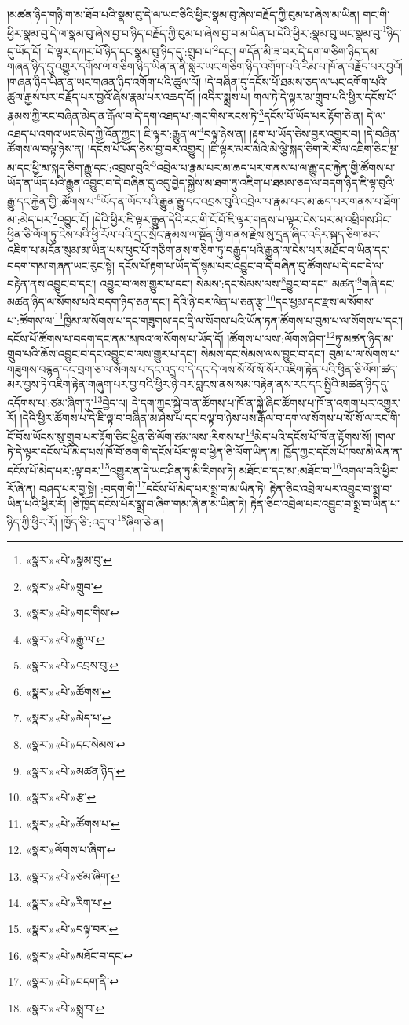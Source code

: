 །མཚན་ཉིད་གཉི་ག་མ་ཐོབ་པའི་སྣམ་བུ་དེ་ལ་ཡང་ཅིའི་ཕྱིར་སྣམ་བུ་ཞེས་བརྗོད་ཀྱི་བུམ་པ་ཞེས་མ་ཡིན། གང་གི་ཕྱིར་སྣམ་བུ་དེ་ལ་སྣམ་བུ་ཞེས་བྱ་བ་ཉིད་བརྗོད་ཀྱི་བུམ་པ་ཞེས་བྱ་བ་མ་ཡིན་པ་དེའི་ཕྱིར་:སྣམ་བུ་ཡང་སྣམ་བུ་\footnote{«སྣར་»«པེ་»སྣམ་བུ་}ཉིད་དུ་ཡོད་དོ། །དེ་ལྟར་དཀར་པོ་ཉིད་དང་སྣམ་བུ་ཉིད་དུ་:གྲུབ་པ་\footnote{«སྣར་»«པེ་»གྲུབ་}དང་། གདོན་མི་ཟ་བར་དེ་དག་གཅིག་ཉིད་དམ་གཞན་ཉིད་དུ་འགྱུར་དགོས་ལ་གཅིག་ཉིད་ཡིན་ན་ནི་སླར་ཡང་གཅིག་ཉིད་འགོག་པའི་རིམ་པ་ཁོ་ན་བརྗོད་པར་བྱའོ། །གཞན་ཉིད་ཡིན་ན་ཡང་གཞན་ཉིད་འགོག་པའི་ཚུལ་ལོ། །དེ་བཞིན་དུ་དངོས་པོ་ཐམས་ཅད་ལ་ཡང་འགོག་པའི་ཚུལ་རྒྱས་པར་བརྗོད་པར་བྱའོ་ཞེས་རྣམ་པར་འཆད་དོ། །འདིར་སྨྲས་པ། གལ་ཏེ་དེ་ལྟར་མ་གྲུབ་པའི་ཕྱིར་དངོས་པོ་རྣམས་ཀྱི་རང་བཞིན་མེད་ན་རྒོལ་བ་དེ་དག་འཐད་པ་:གང་གིས་རངས་ཏེ་\footnote{«སྣར་»«པེ་»གང་གིས་}དངོས་པོ་ཡོད་པར་རྟོག་ཅེ་ན། དེ་ལ་འཐད་པ་འགའ་ཡང་མེད་ཀྱི་འོན་ཀྱང་། ཇི་ལྟར་:རྒྱུན་ལ་\footnote{«སྣར་»«པེ་»རྒྱུ་ལ་}བལྟ་ཉེས་ན། །རྟག་པ་ཡོད་ཅེས་བྱར་འགྱུར་བ། །དེ་བཞིན་ཚོགས་ལ་བལྟ་ཉེས་ན། །དངོས་པོ་ཡོད་ཅེས་བྱ་བར་འགྱུར། །ཇི་ལྟར་མར་མེའི་མེ་ལྕེ་སྐད་ཅིག་རེ་རེ་ལ་འཇིག་ཅིང་སྔ་མ་དང་ཕྱི་མ་སྐད་ཅིག་རྒྱུ་དང་:འབྲས་བུའི་\footnote{«སྣར་»«པེ་»འབྲས་བུ་}འབྲེལ་པ་རྣམ་པར་མ་ཆད་པར་གནས་པ་ལ་རྒྱུ་དང་རྐྱེན་གྱི་ཚོགས་པ་ཡོད་ན་ཡོད་པའི་རྒྱུན་འབྱུང་བ་དེ་བཞིན་དུ་འདུ་བྱེད་སྐྱེས་མ་ཐག་ཏུ་འཇིག་པ་ཐམས་ཅད་ལ་བདག་ཉིད་ཇི་ལྟ་བུའི་རྒྱུ་དང་རྐྱེན་གྱི་:ཚོགས་པ་\footnote{«སྣར་»«པེ་»ཚོགས་}ཡོད་ན་ཡོད་པའི་རྒྱུན་རྒྱུ་དང་འབྲས་བུའི་འབྲེལ་པ་རྣམ་པར་མ་ཆད་པར་གནས་པ་ཐོག་མ་:མེད་པར་\footnote{«སྣར་»«པེ་»མེད་པ་}འབྱུང་ངོ། །དེའི་ཕྱིར་ཇི་ལྟར་རྒྱུན་དེའི་རང་གི་ངོ་བོ་ཇི་ལྟར་གནས་པ་ལྟར་ངེས་པར་མ་འཕྲིགས་ཤིང་ཕྱིན་ཅི་ལོག་ཏུ་ངེས་པའི་ཕྱི་རོལ་པའི་དྲང་སྲོང་རྣམས་ལ་སྔོན་གྱི་གནས་རྗེས་སུ་དྲན་ཞིང་འདིར་སྐད་ཅིག་མར་འཇིག་པ་མངོན་སུམ་མ་ཡིན་པས་ཕུང་པོ་གཅིག་ནས་གཅིག་ཏུ་བརྒྱུད་པའི་རྒྱུན་ལ་ངེས་པར་མཐོང་བ་ཡིན་དང་བདག་གམ་གཞན་ཡང་རུང་སྟེ། དངོས་པོ་རྟག་པ་ཡོད་དོ་སྙམ་པར་འབྱུང་བ་དེ་བཞིན་དུ་ཚོགས་པ་དེ་དང་དེ་ལ་བརྟེན་ནས་འབྱུང་བ་དང་། འབྱུང་བ་ལས་གྱུར་པ་དང་། སེམས་:དང་སེམས་ལས་\footnote{«སྣར་»«པེ་»དང་སེམས་}བྱུང་བ་དང་། མཚན་\footnote{«སྣར་»«པེ་»མཚན་ཉིད་}གཞི་དང་མཚན་ཉིད་ལ་སོགས་པའི་བདག་ཉིད་ཅན་དང་། དེའི་ཉེ་བར་ལེན་པ་ཅན་རྩྭ་\footnote{«སྣར་»«པེ་»རྩ་}དང་ཕྱམ་དང་རྫས་ལ་སོགས་པ་:ཚོགས་ལ་\footnote{«སྣར་»«པེ་»ཚོགས་པ་}ཁྱིམ་ལ་སོགས་པ་དང་གཟུགས་དང་དྲི་ལ་སོགས་པའི་ཡོན་ཏན་ཚོགས་པ་བུམ་པ་ལ་སོགས་པ་དང་། དངོས་པོ་ཚོགས་པ་བདག་དང་ནམ་མཁའ་ལ་སོགས་པ་ཡོད་དོ། །ཚོགས་པ་ལས་:ལོགས་ཤིག་\footnote{«སྣར་»ལོགས་པ་ཞིག་}ཏུ་མཚན་ཉིད་མ་གྲུབ་པའི་ཆོས་འབྱུང་བ་དང་འབྱུང་བ་ལས་གྱུར་པ་དང་། སེམས་དང་སེམས་ལས་བྱུང་བ་དང་། བུམ་པ་ལ་སོགས་པ་གཟུགས་བརྙན་དང་བྲག་ཅ་ལ་སོགས་པ་དང་འདྲ་བ་དེ་དང་དེ་ལས་སོ་སོ་སོ་སོར་འཇིག་རྟེན་པའི་ཕྱིན་ཅི་ལོག་ཚད་མར་བྱས་ཏེ་འཇིག་རྟེན་གཞུག་པར་བྱ་བའི་ཕྱིར་ཉེ་བར་བླངས་ནས་སམ་བརྟེན་ནས་རང་དང་སྤྱིའི་མཚན་ཉིད་དུ་འདོགས་པ་:ཙམ་ཞིག་ཏུ་\footnote{«སྣར་»«པེ་»ཙམ་ཞིག་}བྱེད་ལ། དེ་དག་ཀྱང་སྐྱེ་བ་ན་ཚོགས་པ་ཁོ་ན་སྐྱེ་ཞིང་ཚོགས་པ་ཁོ་ན་འགག་པར་འགྱུར་རོ། །དེའི་ཕྱིར་ཚོགས་པ་དེ་ཇི་ལྟ་བ་བཞིན་མ་ཤེས་པ་དང་བལྟ་བ་ཉེས་པས་རྒོལ་བ་དག་ལ་སོགས་པ་སོ་སོ་ལ་རང་གི་ངོ་བོས་ཡོངས་སུ་གྲུབ་པར་རྟོག་ཅིང་ཕྱིན་ཅི་ལོག་ཙམ་ལས་:རིགས་པ་\footnote{«སྣར་»«པེ་»རིག་པ་}མེད་པའི་དངོས་པོ་ཁོ་ན་རྟོགས་སོ། །གལ་ཏེ་དེ་ལྟར་དངོས་པོ་མེད་པས་ཁོ་བོ་ཅག་གི་དངོས་པོར་ལྟ་བ་ཕྱིན་ཅི་ལོག་ཡིན་ན། ཁྱོད་ཀྱང་དངོས་པོ་ཁས་མི་ལེན་ན་དངོས་པོ་མེད་པར་:ལྟ་བར་\footnote{«སྣར་»«པེ་»བལྟ་བར་}འགྱུར་ན་དེ་ཡང་ཤིན་ཏུ་མི་རིགས་ཏེ། མཐོང་བ་དང་མ་:མཐོང་བ་\footnote{«སྣར་»«པེ་»མཐོང་བ་དང་}འགལ་བའི་ཕྱིར་རོ་ཞེ་ན། བཤད་པར་བྱ་སྟེ། :བདག་གི་\footnote{«སྣར་»«པེ་»བདག་ནི་}དངོས་པོ་མེད་པར་སྨྲ་བ་མ་ཡིན་ཏེ། རྟེན་ཅིང་འབྲེལ་པར་འབྱུང་བ་སྨྲ་བ་ཡིན་པའི་ཕྱིར་རོ། །ཅི་ཁྱོད་དངོས་པོར་སྨྲ་བ་ཞིག་གམ་ཞེ་ན་མ་ཡིན་ཏེ། རྟེན་ཅིང་འབྲེལ་པར་འབྱུང་བ་སྨྲ་བ་ཡིན་པ་ཉིད་ཀྱི་ཕྱིར་རོ། །ཁྱོད་ཅི་:འདྲ་བ་\footnote{«སྣར་»«པེ་»སྨྲ་བ་}ཞིག་ཅེ་ན། 